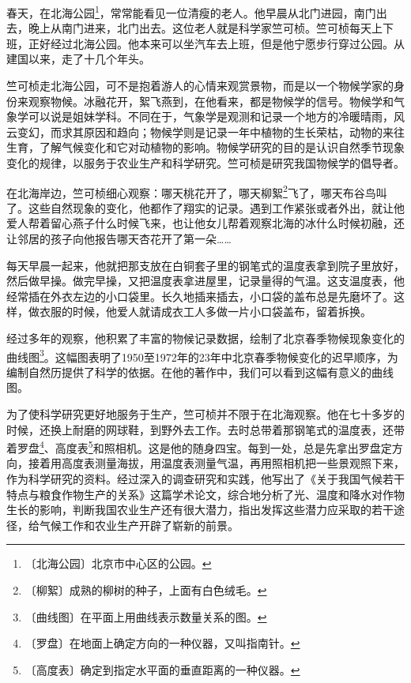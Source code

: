 \documentclass[12pt,UTF-8,openany]{ctexbook}
\begin{document}
\begin{large}
    
    春天，在北海公园\footnote{〔北海公园〕北京市中心区的公园。}，常常能看见一位清瘦的老人。他早晨从北门进园，南门出去，晚上从南门进来，北门出去。这位老人就是科学家竺可桢。竺可桢每天上下班，正好经过北海公园。他本来可以坐汽车去上班，但是他宁愿步行穿过公园。从建国以来，走了十几个年头。
    
    竺可桢走北海公园，可不是抱着游人的心情来观赏景物，而是以一个物候学家的身份来观察物候。冰融花开，絮飞燕到，在他看来，都是物候学的信号。物候学和气象学可以说是姐妹学科。不同在于，气象学是观测和记录一个地方的冷暖晴雨，风云变幻，而求其原因和趋向；物候学则是记录一年中植物的生长荣枯，动物的来往生育，了解气候变化和它对动植物的影响。物候学研究的目的是认识自然季节现象变化的规律，以服务于农业生产和科学研究。竺可桢是研究我国物候学的倡导者。
    
    在北海岸边，竺可桢细心观察：哪天桃花开了，哪天柳絮\footnote{〔柳絮〕成熟的柳树的种子，上面有白色绒毛。}飞了，哪天布谷鸟叫了。这些自然现象的变化，他都作了翔实的记录。遇到工作紧张或者外出，就让他爱人帮着留心燕子什么时候飞来，也让他女儿帮着观察北海的冰什么时候初融，还让邻居的孩子向他报告哪天杏花开了第一朵……
    
    每天早晨一起来，他就把那支放在白铜套子里的钢笔式的温度表拿到院子里放好，然后做早操。做完早操，又把温度表拿进屋里，记录量得的气温。这支温度表，他经常插在外衣左边的小口袋里。长久地插来插去，小口袋的盖布总是先磨坏了。这样，做衣服的时候，他爱人就请成衣工人多做一片小口袋盖布，留着拆换。
    
    经过多年的观察，他积累了丰富的物候记录数据，绘制了北京春季物候现象变化的曲线图\footnote{〔曲线图〕在平面上用曲线表示数量关系的图。}。这幅图表明了1950至1972年的23年中北京春季物候变化的迟早顺序，为编制自然历提供了科学的依据。在他的著作中，我们可以看到这幅有意义的曲线图。
    
    为了使科学研究更好地服务于生产，竺可桢并不限于在北海观察。他在七十多岁的时候，还换上耐磨的网球鞋，到野外去工作。去时总带着那钢笔式的温度表，还带着罗盘\footnote{〔罗盘〕在地面上确定方向的一种仪器，又叫指南针。}、高度表\footnote{〔高度表〕确定到指定水平面的垂直距离的一种仪器。}和照相机。这是他的随身四宝。每到一处，总是先拿出罗盘定方向，接着用高度表测量海拔，用温度表测量气温，再用照相机把一些景观照下来，作为科学研究的资料。经过深入的调查研究和实践，他写出了《关于我国气候若干特点与粮食作物生产的关系》这篇学术论文，综合地分析了光、温度和降水对作物生长的影响，判断我国农业生产还有很大潜力，指出发挥这些潜力应采取的若干途径，给气候工作和农业生产开辟了崭新的前景。
    
\end{large}
\end{document}
